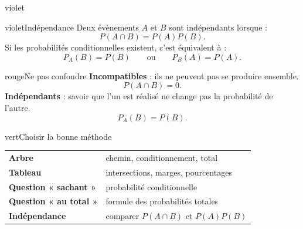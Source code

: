 \documentclass[11pt,a4paper]{article}
\begin{document}
\begin{landscape}
\begin{minipage}[t]{0.242\linewidth}
\begin{panel}{violet}
\begin{fichebox}{violet}{Indépendance}
Deux évènements $A$ et $B$ sont indépendants lorsque :
\[
P(A\cap B)=P(A)P(B).
\]
Si les probabilités conditionnelles existent, c'est équivalent à :
\[
P_A(B)=P(B)
\qquad\text{ou}\qquad
P_B(A)=P(A).
\]
\end{fichebox}

\begin{fichebox}{rouge}{Ne pas confondre}
\textbf{Incompatibles} : ils ne peuvent pas se produire ensemble.
\[
P(A\cap B)=0.
\]
\textbf{Indépendants} : savoir que l'un est réalisé ne change pas la probabilité de l'autre.
\[
P_A(B)=P(B).
\]
\end{fichebox}

\begin{fichebox}{vert}{Choisir la bonne méthode}
\begin{tabularx}{\linewidth}{@{}>{\bfseries}lX@{}}
Arbre & chemin, conditionnement, total\\
Tableau & intersections, marges, pourcentages\\
Question « sachant » & probabilité conditionnelle\\
Question « au total » & formule des probabilités totales\\
Indépendance & comparer $P(A\cap B)$ et $P(A)P(B)$
\end{tabularx}
\end{fichebox}

\end{panel}
\end{minipage}

\end{landscape}
\clearpage
\nopagecolor
\restoregeometry
\pagestyle{fancy}
\end{document}
